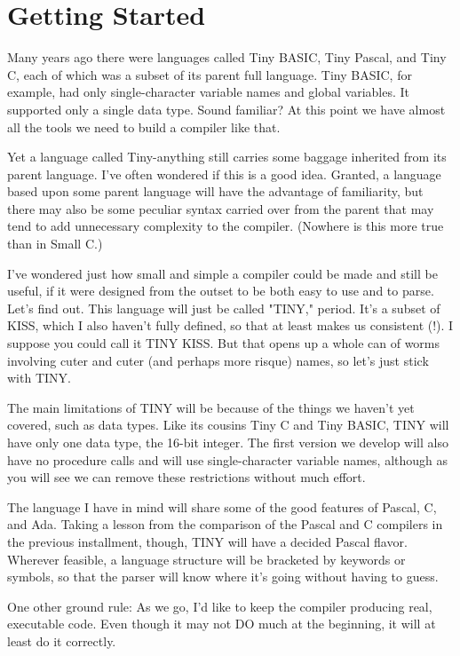 \section{Getting Started}

Many  years  ago  there were languages called  Tiny  BASIC, Tiny Pascal, and Tiny C, each of which was a subset of its parent full language. Tiny BASIC, for  example, had  only single-character variable names and global variables. It supported only a single data type. Sound familiar?  At this point we have almost all the tools we need to build a compiler like that.

Yet a language called Tiny-anything  still  carries  some baggage inherited from its parent language. I've often wondered if this is a  good  idea. Granted, a  language based upon some parent language will have the  advantage  of  familiarity, but there may also  be  some  peculiar syntax carried over from the parent that may tend  to add unnecessary complexity to the compiler. (Nowhere is this more true than in Small C.)

I've wondered just how small and simple a compiler could  be made and  still  be  useful, if it were designed from the outset to be both easy to use and to  parse. Let's find out. This language will just be called "TINY," period. It's a subset of KISS, which I  also  haven't  fully  defined, so  that  at  least  makes  us consistent (!). I suppose you could call it TINY KISS. But that opens  up a whole can of worms involving  cuter  and  cuter  (and perhaps more risque) names, so let's just stick with TINY.

The main limitations  of  TINY  will  be because of the things we haven't yet covered, such as data types. Like its cousins Tiny C and Tiny BASIC, TINY  will  have  only one data type, the 16-bit integer. The  first  version  we  develop  will also  have  no procedure  calls  and  will  use single-character variable names, although as you will see we can remove these restrictions without much effort.

The language I have in mind will share some of the  good features of  Pascal, C, and Ada. Taking a lesson from the comparison of the Pascal and  C  compilers in the previous installment, though, TINY will have a decided Pascal flavor. Wherever  feasible, a language structure will  be  bracketed by keywords or symbols, so that  the parser will know where it's  going  without  having  to guess.

One other ground rule:  As we go, I'd like  to  keep the compiler producing real, executable code. Even though it may not  DO much at the beginning, it will at least do it correctly.

